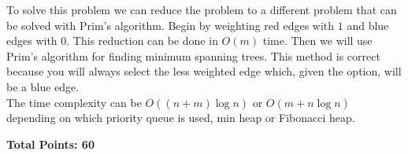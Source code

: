 \documentclass[11pt]{article}
\begin{document}
\begin{enumerate}
\begin{tcolorbox}

  To solve this problem we can reduce the problem to a different problem that can be solved
  with Prim's algorithm. Begin by weighting red edges with $1$ and blue edges with $0$. This
  reduction can be done in $O(m)$ time. Then we will use Prim's algorithm for
  finding minimum spanning trees.
  This method is correct because you will always select the
  less weighted edge which, given the option, will be a blue edge.\\

  The time complexity can be $O( (n+m) \log n)$ or $O( m + n \log n)$ depending on
  which priority queue is used, min heap or Fibonacci heap.

\end{tcolorbox}

\end{enumerate}


{\bf Total Points: 60}
\end{document}
